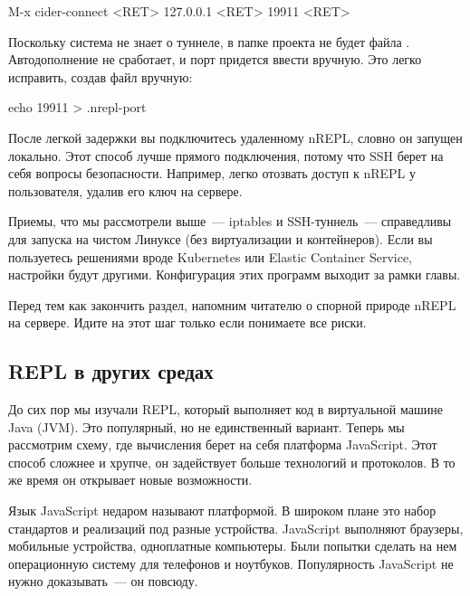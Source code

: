 \begin{english}
  \begin{clojure}
M-x cider-connect <RET> 127.0.0.1 <RET> 19911 <RET>
  \end{clojure}
\end{english}

Поскольку система не знает о туннеле, в папке проекта не будет файла . Автодополнение не сработает, и порт придется ввести вручную. Это легко исправить, создав файл вручную:

\begin{english}
  \begin{bash}
echo 19911 > .nrepl-port
  \end{bash}
\end{english}

После легкой задержки вы подключитесь удаленному nREPL, словно он запущен локально. Этот способ лучше прямого подключения, потому что SSH берет на себя вопросы безопасности. Например, легко отозвать доступ к nREPL у пользователя, удалив его ключ на сервере.

Приемы, что мы рассмотрели выше~--- iptables и SSH-туннель~--- справедливы для запуска на чистом Линуксе (без виртуализации и контейнеров). Если вы пользуетесь решениями вроде Kubernetes или Elastic Container Service, настройки будут другими. Конфигурация этих программ выходит за рамки главы.

Перед тем как закончить раздел, напомним читателю о спорной природе nREPL на сервере. Идите на этот шаг только если понимаете все риски.

\subsection{REPL в других средах}

До сих пор мы изучали REPL, который выполняет код в виртуальной машине Java (JVM). Это популярный, но не единственный вариант. Теперь мы рассмотрим схему, где вычисления берет на себя платформа JavaScript. Этот способ сложнее и хрупче, он задействует больше технологий и протоколов. В то же время он открывает новые возможности.

Язык JavaScript недаром называют платформой. В широком плане это набор стандартов и реализаций под разные устройства. JavaScript выполняют браузеры, мобильные устройства, одноплатные компьютеры. Были попытки сделать на нем операционную систему для телефонов и ноутбуков. Популярность JavaScript не нужно доказывать~--- он повсюду.

